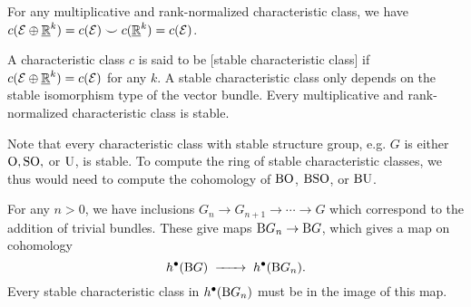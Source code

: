 \begin{corollary}
	For any multiplicative and rank-normalized characteristic class, we have $c(\mathcal{E}\oplus \underline{\mathbb{R}}^k)=c(\mathcal{E})\smile c(\underline{\mathbb{R}}^k)= c(\mathcal{E})$.
\end{corollary}

\begin{definition}
	A characteristic class $c$ is said to be [stable characteristic class] if $c(\mathcal{E}\oplus \underline{\mathbb{R}}^k) = c(\mathcal{E})$ for any $k$. A stable characteristic class only depends on the stable isomorphism type of the vector bundle. Every multiplicative and rank-normalized characteristic class is stable.
\end{definition}

\begin{remark}
	Note that every characteristic class with stable structure group, e.g. $G$ is either $\mathrm{O}, \mathrm{SO},$ or $\mathrm{U}$, is stable. To compute the ring of stable characteristic classes, we thus would need to compute the cohomology of $\mathrm{BO}$, $\mathrm{BSO}$, or $\mathrm{BU}$.

	For any $n>0$, we have inclusions $G_n \to G_{n+1} \to \cdots \to G$ which correspond to the addition of trivial bundles. These give maps $\mathrm{B} G_n \to \mathrm{B} G$, which gives a map on cohomology
	\[
		h^\bullet(\BB G) \lkxto h^\bullet(\BB G_n).
	\]
	Every stable characteristic class in $h^\bullet(\mathrm{B} G_n)$ must be in the image of this map.
\end{remark}

